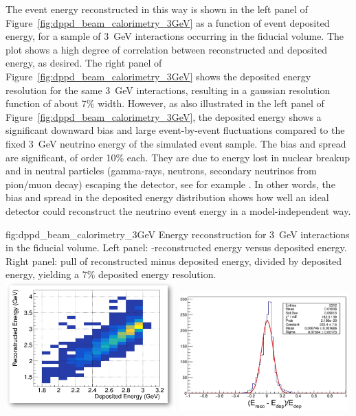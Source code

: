 The event energy reconstructed in this way is shown in the left panel of Figure~\ref{fig:dppd_beam_calorimetry_3GeV} as a function of event deposited energy, for a sample of \SI{3}{\GeV} \nue {} interactions occurring in the \lar fiducial volume. The plot shows a high degree of correlation between reconstructed and deposited energy, as desired. The right panel of Figure~\ref{fig:dppd_beam_calorimetry_3GeV} shows the deposited energy resolution for the same \SI{3}{\GeV} interactions, resulting in a gaussian resolution function of about \num{7}\% width. However, as also illustrated in the left panel of Figure~\ref{fig:dppd_beam_calorimetry_3GeV}, the deposited energy shows a significant downward bias and large event-by-event fluctuations compared to the fixed \SI{3}{GeV} neutrino energy of the simulated event sample. The bias and  spread are significant, of order \num{10}\% each. They are due to energy lost in nuclear breakup and in neutral particles (gamma-rays, neutrons, secondary neutrinos from pion/muon decay) escaping the detector, see for example \cite{Friedland:2018vry}. In other words, the bias and spread in the deposited energy distribution shows how well an ideal detector could reconstruct the neutrino event energy in a model-independent way.

\begin{dunefigure}{fig:dppd_beam_calorimetry_3GeV}
{Energy reconstruction for \SI{3}{GeV} \nue {} interactions in the \lar fiducial volume. Left panel: -reconstructed energy versus deposited energy. Right panel: pull of reconstructed minus deposited energy, divided by deposited energy, yielding a \num{7}\% deposited energy resolution.}
\includegraphics[width=0.49\textwidth]{graphics/dppd_ereco_vs_edep_nuecc_3gev.png} \hfill
\includegraphics[width=0.49\textwidth]{graphics/dppd_edep_resolution_nuecc_3gev.png}
\end{dunefigure}

